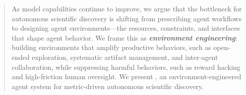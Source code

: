 \documentclass{article} %
\begin{document}
\begin{abstract}
As model capabilities continue to improve,
we argue that the bottleneck for autonomous scientific discovery is shifting from prescribing agent workflows to designing agent environments---the resources, constraints, and interfaces that shape agent behavior.
We frame this 
as \textbf{\textit{environment engineering}}: building environments that amplify productive behaviors, such as open-ended exploration, systematic artifact management, and inter-agent collaboration, while suppressing harmful behaviors, such as reward hacking and high-friction human oversight.
We present \textbf{\method}, an environment-engineered agent system for 
metric-driven autonomous scientific discovery.

\end{abstract}
\end{document}
